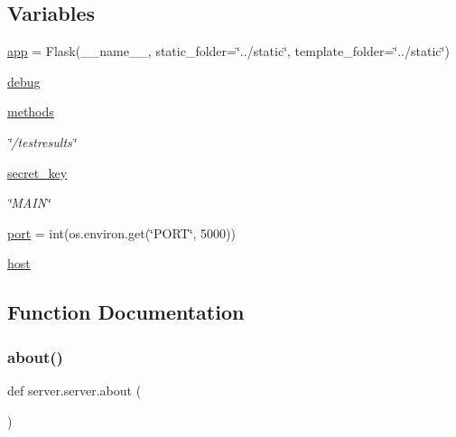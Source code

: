 \subsection*{Variables}
\begin{DoxyCompactItemize}
\item 
\mbox{\hyperlink{namespaceserver_1_1server_abe540ab6e7c9bffd61dda91273e699e2}{app}} = Flask(\+\_\+\+\_\+name\+\_\+\+\_\+, static\+\_\+folder=\char`\"{}../static\char`\"{}, template\+\_\+folder=\char`\"{}../static\char`\"{})
\item 
\mbox{\hyperlink{namespaceserver_1_1server_addf5a8b97b626d4622f3fb2b2f8065ab}{debug}}
\item 
\mbox{\hyperlink{namespaceserver_1_1server_a1e0984522028dec04483b66d00e8b6b6}{methods}}
\begin{DoxyCompactList}\small\item\em \char`\"{}/testresults\char`\"{} \end{DoxyCompactList}\item 
\mbox{\hyperlink{namespaceserver_1_1server_a70d8440bb9056abff06b917ecacce061}{secret\+\_\+key}}
\begin{DoxyCompactList}\small\item\em \char`\"{}\+M\+A\+I\+N\char`\"{} \end{DoxyCompactList}\item 
\mbox{\hyperlink{namespaceserver_1_1server_aba3c9bb7c915469f57a050466a1ef6d8}{port}} = int(os.\+environ.\+get(\char`\"{}P\+O\+RT\char`\"{}, 5000))
\item 
\mbox{\hyperlink{namespaceserver_1_1server_adca03b39e1ec441d3c574a753afb0016}{host}}
\end{DoxyCompactItemize}


\subsection{Function Documentation}
\mbox{\label{namespaceserver_1_1server_a7bdc96668852473d18262dd1185ac3d9}} 
\subsubsection{\texorpdfstring{about()}{about()}}
{\footnotesize\ttfamily def server.\+server.\+about (\begin{DoxyParamCaption}{ }\end{DoxyParamCaption})}



